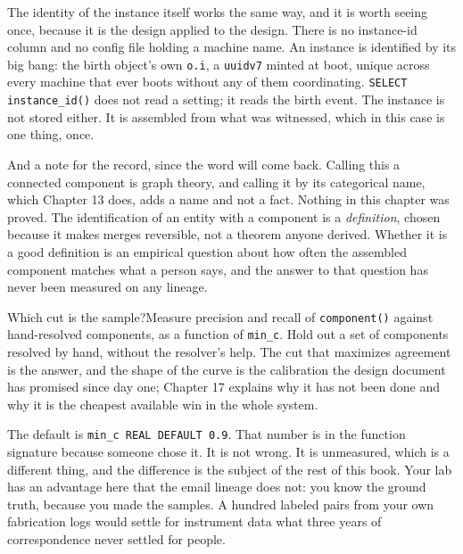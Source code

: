 The identity of the instance itself works the same way, and it is worth seeing once, because it is the design applied to the design. There is no instance-id column and no config file holding a machine name. An instance is identified by its big bang: the birth object's own \texttt{o.i}, a \texttt{uuidv7} minted at boot, unique across every machine that ever boots without any of them coordinating. \texttt{SELECT instance\_id()} does not read a setting; it reads the birth event. The instance is not stored either. It is assembled from what was witnessed, which in this case is one thing, once.

And a note for the record, since the word will come back. Calling this a connected component is graph theory, and calling it by its categorical name, which Chapter 13 does, adds a name and not a fact. Nothing in this chapter was proved. The identification of an entity with a component is a \emph{definition}, chosen because it makes merges reversible, not a theorem anyone derived. Whether it is a good definition is an empirical question about how often the assembled component matches what a person says, and the answer to that question has never been measured on any lineage.

\begin{Open}{Which cut is the sample?}{Measure precision and recall of \texttt{component()} against hand-resolved components, as a function of \texttt{min\_c}.}
Hold out a set of components resolved by hand, without the resolver's help. The cut that maximizes agreement is the answer, and the shape of the curve is the calibration the design document has promised since day one; Chapter 17 explains why it has not been done and why it is the cheapest available win in the whole system.

The default is \texttt{min\_c REAL DEFAULT 0.9}. That number is in the function signature because someone chose it. It is not wrong. It is unmeasured, which is a different thing, and the difference is the subject of the rest of this book. Your lab has an advantage here that the email lineage does not: you know the ground truth, because you made the samples. A hundred labeled pairs from your own fabrication logs would settle for instrument data what three years of correspondence never settled for people.
\end{Open}
